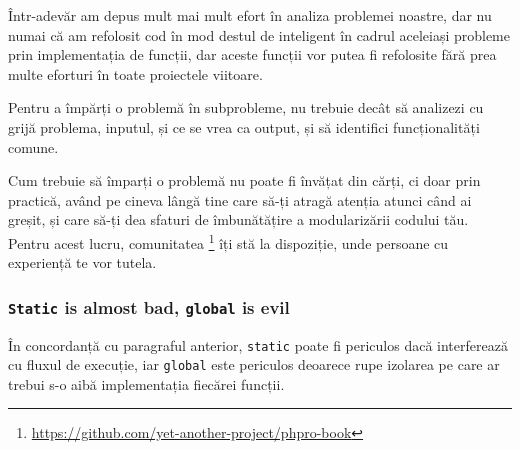 Într-adevăr am depus mult mai mult efort în analiza problemei noastre, dar
nu numai că am refolosit cod în mod destul de inteligent în
cadrul aceleiași probleme prin implementația
de funcții, dar aceste funcții vor putea fi refolosite fără prea multe
eforturi în toate proiectele viitoare.

Pentru a împărți o problemă în subprobleme, nu trebuie decât să analizezi
cu grijă problema, inputul, și ce se vrea ca output, și să identifici
funcționalități comune.

Cum trebuie să împarți o problemă nu poate fi învățat din cărți, ci doar
prin practică, având pe cineva lângă tine care să-ți atragă atenția
atunci când ai greșit, și care să-ți dea sfaturi de îmbunătățire
a modularizării codului tău. Pentru acest lucru, comunitatea
{\phpro}\footnote{\url{https://github.com/yet-another-project/phpro-book}}
îți stă la dispoziție, unde persoane cu experiență te vor tutela.


\subsubsection{\texttt{Static} is almost bad, \texttt{global} is evil}
În concordanță cu paragraful anterior, \texttt{static} poate fi periculos
dacă interferează cu fluxul de execuție, iar \texttt{global} este
periculos deoarece rupe izolarea pe care ar trebui s-o aibă implementația
fiecărei funcții.

